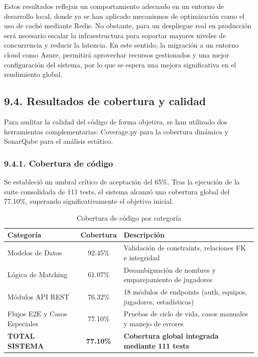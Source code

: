 Estos resultados reflejan un comportamiento adecuado en un entorno de desarrollo local, donde ya se han aplicado mecanismos de
optimización como el uso de caché mediante Redis. No obstante, para un despliegue real en producción será
necesario escalar la infraestructura para soportar mayores niveles de concurrencia y reducir la latencia.
En este sentido, la migración a un entorno cloud como Azure, permitirá
aprovechar recursos gestionados y una mejor configuración del sistema, por lo que se espera una mejora significativa 
en el rendimiento global.


\subsection{9.4. Resultados de cobertura y calidad}

Para auditar la calidad del código de forma objetiva, se han 
utilizado dos herramientas complementarias: Coverage.py para la 
cobertura dinámica y SonarQube para el análisis estático.


\subsubsection{9.4.1. Cobertura de código}

Se estableció un umbral crítico de aceptación del 65\%. Tras la 
ejecución de la suite consolidada de 111 tests, el sistema alcanzó 
una cobertura global del 77.10\%, superando significativamente el 
objetivo inicial.

\begin{table}[H]
\centering
\small
\begin{tabular}{|p{3.5cm}|c|p{5cm}|}
\hline
\textbf{Categoría} & \textbf{Cobertura} & \textbf{Descripción} \\
\hline
Modelos de Datos & 92.45\% & Validación de constraints, 
relaciones FK e integridad \\
\hline
Lógica de Matching & 61.07\% & Desambiguación de nombres y 
emparejamiento de jugadores \\
\hline
Módulos API REST & 76.32\% & 18 módulos de endpoints (auth, 
equipos, jugadores, estadísticas) \\
\hline
Flujos E2E y Casos Especiales & 77.10\% & Pruebas de ciclo de vida, 
casos manuales y manejo de errores \\
\hline
\textbf{TOTAL SISTEMA} & \textbf{77.10\%} & \textbf{Cobertura global 
integrada mediante 111 tests} \\
\hline
\end{tabular}
\caption{Cobertura de código por categoría}
\end{table}

